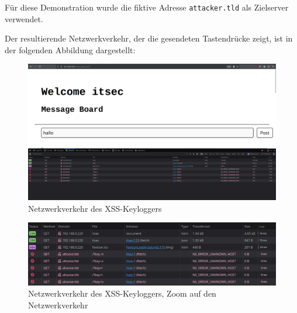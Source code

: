 \documentclass[
    a4paper,
    pagesize,
	pdftex,
    12pt,
]{scrartcl}
\begin{document}
\noindent Für diese Demonstration wurde die fiktive Adresse \lstinline|attacker.tld| als Zielserver verwendet.

\noindent Der resultierende Netzwerkverkehr, der die gesendeten Tastendrücke zeigt, ist in der folgenden Abbildung dargestellt:

\begin{figure}[H]
	\centering
	\includegraphics[width=15cm]{xss-keylogger-network-traffic.png}
	\caption{Netzwerkverkehr des XSS-Keyloggers}
	\label{fig:xss-keylogger-network-traffic}
\end{figure}

\begin{figure}[H]
	\centering
	\includegraphics[width=17cm]{xss-keylogger-network-traffic-2.png}
	\caption{Netzwerkverkehr des XSS-Keyloggers, Zoom auf den Netzwerkverkehr}
	\label{fig:xss-keylogger-network-traffic-2}
\end{figure}
\end{document}
